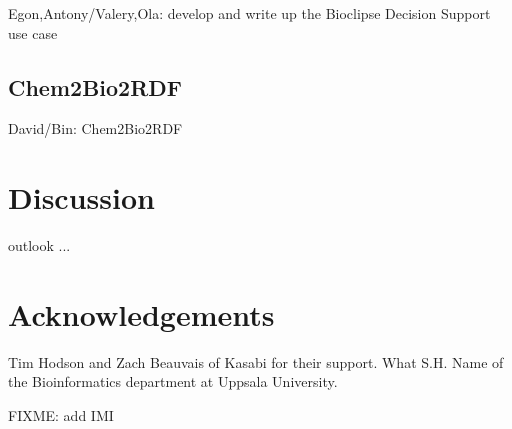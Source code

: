 \documentclass[sw]{iosart2c}
\begin{document}
Egon,Antony/Valery,Ola: develop and write up the Bioclipse Decision Support use case

\subsection{Chem2Bio2RDF}

David/Bin: Chem2Bio2RDF

\section{Discussion}

outlook ...

\section{Acknowledgements}

Tim Hodson and Zach Beauvais of Kasabi for their support. What S.H. Name of the Bioinformatics department at Uppsala University.

FIXME: add IMI



%
%
%
\end{document}
